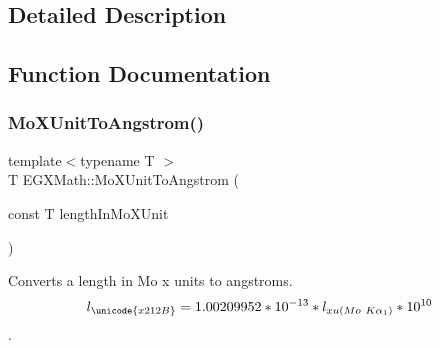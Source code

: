 \subsection{Detailed Description}


\subsection{Function Documentation}
\mbox{\label{group___e_g_x_math-_conversions-_length_conversions-_non-_s_i-_mo_x_unit-_non-_s_i_ga1846652500863bdef905f209f3c5e0ae}} 
\subsubsection{\texorpdfstring{Mo\+X\+Unit\+To\+Angstrom()}{MoXUnitToAngstrom()}}
{\footnotesize\ttfamily template$<$typename T $>$ \\
T E\+G\+X\+Math\+::\+Mo\+X\+Unit\+To\+Angstrom (\begin{DoxyParamCaption}\item[{const T}]{length\+In\+Mo\+X\+Unit }\end{DoxyParamCaption})}



Converts a length in Mo x units to angstroms. \[ l_{\unicode{x212B}}=1.00209952*10^{-13} * l_{xu(Mo\ K\alpha_1)} * 10^{10} \]. 

